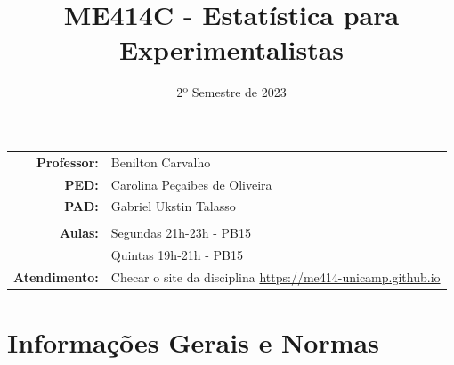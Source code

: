 \documentclass[paper=letter, fontsize=12pt]{scrartcl} %
\title{\normalfont \LARGE ME414C - Estatística para Experimentalistas}
\subtitle{2º Semestre de 2023}
\author{}
\date{}
\begin{document}
\maketitle

\vspace{-1.5cm}

\noindent
\begin{tabular}{rl}
\textbf{Professor:} & 	 Benilton Carvalho \\
\textbf{PED:} 	    & Carolina Peçaibes de Oliveira \\
\textbf{PAD:} 	    & Gabriel Ukstin Talasso \\
\\
\textbf{Aulas:} & Segundas 21h-23h - PB15\\
                & Quintas 19h-21h - PB15 \\
\textbf{Atendimento:} & Checar o site da disciplina \href{https://me414-unicamp.github.io}{https://me414-unicamp.github.io}\\



\end{tabular}

\section{Informações Gerais e Normas}
\end{document}
